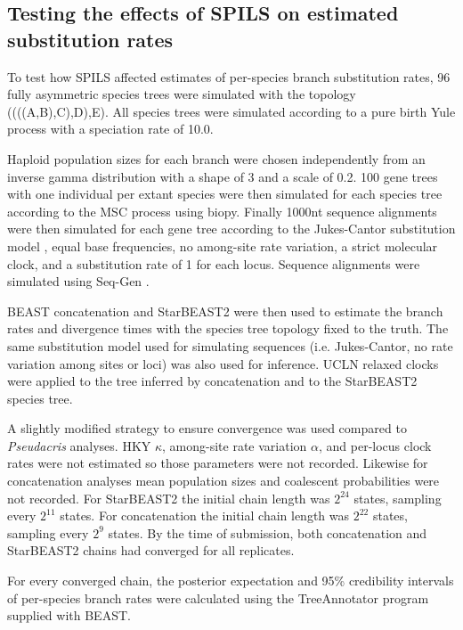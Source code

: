 \documentclass[nogrid]{MBE}%
\begin{document}
\subsection{Testing the effects of SPILS on estimated substitution rates}

To test how SPILS affected estimates of per-species branch substitution rates,
96 fully asymmetric species trees were simulated with the topology
((((A,B),C),D),E). All species trees were simulated according to a pure birth Yule
process \citep{Yule21} with a speciation rate of 10.0.

Haploid population sizes for each branch were chosen independently from an
inverse gamma distribution with a shape of 3 and a scale of 0.2. 100 gene trees
with one individual per extant species were then simulated for each species tree
according to the MSC process using biopy. Finally 1000nt sequence alignments
were then simulated for each gene tree according to the Jukes-Cantor
substitution model \citep{JUKES196921}, equal base frequencies, no among-site
rate variation, a strict molecular clock, and a substitution rate of 1 for each
locus. Sequence alignments were simulated using Seq-Gen \citep{Rambaut01061997}.

BEAST concatenation and StarBEAST2 were then used to estimate the branch rates
and divergence times with the species tree topology fixed to the truth. The same
substitution model used for simulating sequences (i.e. Jukes-Cantor, no rate
variation among sites or loci) was also used for inference. UCLN relaxed
clocks were applied to the tree inferred by concatenation and to the
StarBEAST2 species tree.

A slightly modified strategy to ensure convergence was used compared to
\textit{Pseudacris} analyses. HKY $\kappa$, among-site rate variation $\alpha$,
and per-locus clock rates were not estimated so those parameters were not
recorded. Likewise for concatenation analyses mean population sizes and coalescent
probabilities were not recorded. For StarBEAST2 the initial chain length was
$2^{24}$ states, sampling every $2^{11}$ states. For concatenation the initial
chain length was $2^{22}$ states, sampling every $2^{9}$ states. By the time of
submission, both concatenation and StarBEAST2 chains had converged for
all replicates.

For every converged chain, the posterior expectation and 95\% credibility
intervals of per-species branch rates were calculated using the TreeAnnotator
program supplied with BEAST.
\end{document}
